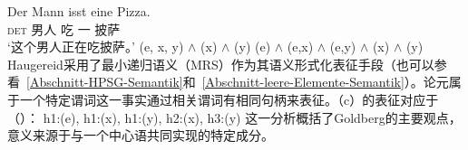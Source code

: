 \begin{exe}
\begin{xlist}[iv.]
\begin{exe}
\begin{xlist}[iv.]
\eal
\ex 
\gll Der Mann isst eine Pizza.\\
	 \textsc{det} 男人 吃 一 披萨\\
\glt `这个男人正在吃披萨。'
\ex {}(e, x, y) $\wedge$ (x) $\wedge$ (y)
\ex {}(e) $\wedge$ (e,x) $\wedge$ (e,y) $\wedge$ (x) $\wedge$ (y)
\zl
Haugereid采用了最小递归语义（MRS）\indexmrsc 作为其语义形式化表征手段（也可以参看~\ref{Abschnitt-HPSG-Semantik}和~\ref{Abschnitt-leere-Elemente-Semantik}）。论元属于一个特定谓词这一事实通过相关谓词有相同句柄来表征。（c）的表征对应于（）：
\ea
h1:(e), h1:(x), h1:(y), h2:(x), h3:(y)
\z
这一分析概括了Goldberg的主要观点，意义来源于与一个中心语共同实现的特定成分。


\end{xlist}
\end{exe}
\end{xlist}
\end{exe}

